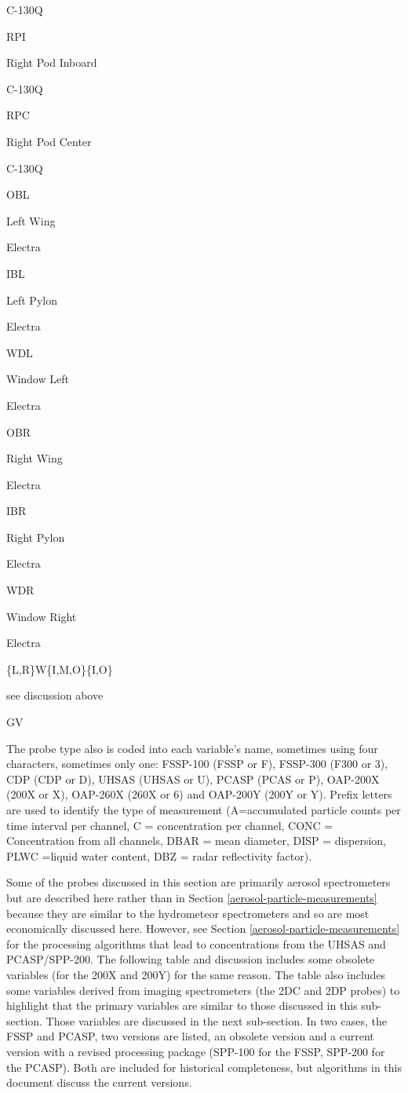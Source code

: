 \documentclass[
  english,
]{book}
\begin{document}
C-130Q

RPI

Right Pod Inboard

C-130Q

RPC

Right Pod Center

C-130Q

OBL

Left Wing

Electra

IBL

Left Pylon

Electra

WDL

Window Left

Electra

OBR

Right Wing

Electra

IBR

Right Pylon

Electra

WDR

Window Right

Electra

\{L,R\}W\{I,M,O\}\{I,O\}

see discussion above

GV

The probe type also is coded into each variable's name, sometimes using four characters, sometimes only one: FSSP-100 (FSSP or F), FSSP-300 (F300 or 3), CDP (CDP or D), UHSAS (UHSAS or U), PCASP (PCAS or P), OAP-200X (200X or X), OAP-260X (260X or 6) and OAP-200Y (200Y or Y). Prefix letters are used to identify the type of measurement (A=accumulated particle counts per time interval per channel, C = concentration per channel, CONC = Concentration from all channels, DBAR = mean diameter, DISP = dispersion, PLWC =liquid water content, DBZ = radar reflectivity factor).

Some of the probes discussed in this section are primarily aerosol spectrometers but are described here rather than in Section \ref{aerosol-particle-measurements} because they are similar to the hydrometeor spectrometers and so are most economically discussed here. However, see Section \ref{aerosol-particle-measurements} for the processing algorithms that lead to concentrations from the UHSAS and PCASP/SPP-200. The following table and discussion includes some obsolete variables (for the 200X and 200Y) for the same reason. The table also includes some variables derived from imaging spectrometers (the 2DC and 2DP probes) to highlight that the primary variables are similar to those discussed in this sub-section. Those variables are discussed in the next sub-section. In two cases, the FSSP and PCASP, two versions are listed, an obsolete version and a current version with a revised processing package (SPP-100 for the FSSP, SPP-200 for the PCASP). Both are included for historical completeness, but algorithms in this document discuss the current versions.
\end{document}
